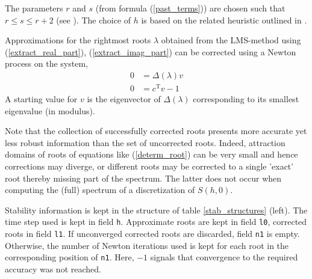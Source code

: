 \documentclass[10pt]{scrartcl}
\newcommand{\T}{\mathrm{T}}
\newcommand{\blist}[1]{\mbox{\lstinline!#1!}}
\begin{document}
{The parameters $r$ and $s$ (from formula (\ref{past_terms}))
are chosen such that $r\leq s\leq r+2$ (see \cite{Hong96}).
The choice of $h$ is based on the related 
heuristic outlined in \cite{engel01}.

Approximations for the rightmost roots $\lambda$ obtained
from the LMS-method using (\ref{extract_real_part}), 
(\ref{extract_imag_part}) can be corrected
using a Newton process on the system,
\begin{equation}\label{determ_root}
\begin{aligned}
0&=\Delta(\lambda)v \\
0&=c^\T v-1
\end{aligned}
\end{equation}
A starting value for $v$ is the eigenvector of 
$\Delta(\lambda)$ corresponding to its smallest eigenvalue (in modulus).

Note that the collection of successfully corrected roots presents more
accurate yet less robust information than the set of uncorrected
roots. Indeed, attraction domains of roots of equations like
(\ref{determ_root}) can be very small and hence corrections may
diverge, or different roots may be corrected to a single 'exact' root
thereby missing part of the spectrum.  The latter does not occur when
computing the (full) spectrum of a discretization of $S(h,0)$.

Stability information is kept in the structure of table
\ref{stab_structures} (left). The time step used is kept in field
\blist{h}. Approximate roots are kept in field \blist{l0}, corrected
roots in field \blist{l1}.  If unconverged corrected roots are
discarded, field \blist{n1} is empty.  Otherwise, the number of Newton
iterations used is kept for each root in the corresponding position of
\blist{n1}. Here, $-1$ signals that convergence to the required
accuracy was not reached.  

}
\end{document}
